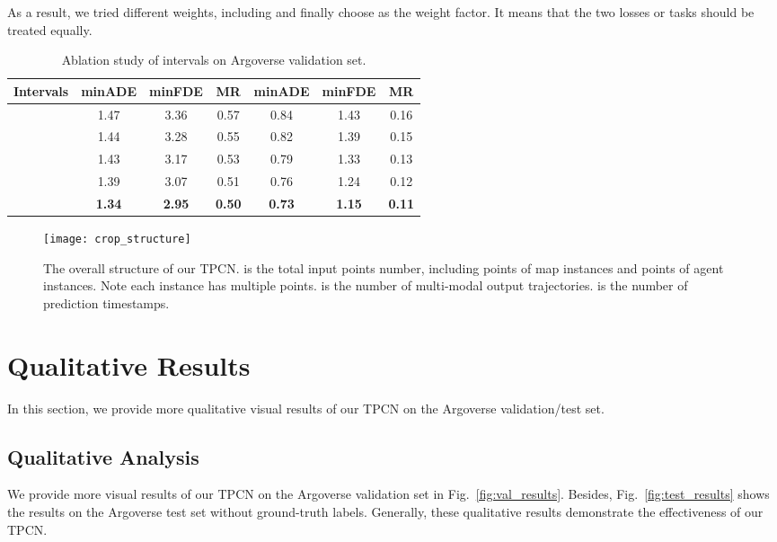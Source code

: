 \documentclass[final]{cvpr}
\begin{document}
As a result, we tried different weights, including  and finally choose  as the weight factor. It means that the two losses or tasks should be treated equally.
\begin{table*}[!t]
   \begin{center}
      \small
      \centering
\def\arraystretch{1.2}
      \begin{tabular}{c |c c c|c c c}
         \hline
         {Intervals}&
         { minADE} & { minFDE} & { MR} & { minADE} & { minFDE} & { MR} \\
         \hline
           & 1.47 & 3.36 & 0.57 & 0.84 & 1.43 & 0.16 \\
         \hline
          & 1.44 & 3.28 & 0.55 & 0.82 & 1.39 & 0.15 \\
         \hline
           & 1.43 & 3.17 & 0.53 & 0.79 & 1.33 & 0.13\\
         \hline
          & 1.39 & 3.07 & 0.51 & 0.76 & 1.24 & 0.12\\ 
         \hline
          & \bf 1.34& \bf 2.95& \bf 0.50 &\bf 0.73 & \bf 1.15 & \bf 0.11 \\
         \hline
      \end{tabular}
   \end{center}
   \caption{Ablation study of intervals on Argoverse validation set.}
   \label{ablation_study_result}
   \vspace{-5px}
\end{table*}

\begin{figure}
    \centering
    \texttt{[image: crop\_structure]}
    \caption{The overall structure of our TPCN.  is the total input points number, including points of  map instances and points of  agent instances. Note each instance has multiple points.  is the number of multi-modal output trajectories.  is the number of prediction timestamps.}
    \label{fig:network}
\end{figure}

\section{Qualitative Results}
\label{sec:analyzes}

In this section, we provide more qualitative visual results of our TPCN on the Argoverse validation/test set.

\subsection{Qualitative Analysis}
We provide more visual results of our TPCN on the Argoverse validation set in Fig.~\ref{fig:val_results}. 
Besides, Fig.~\ref{fig:test_results} shows the results on the Argoverse test set without ground-truth labels.
Generally, these qualitative results demonstrate the effectiveness of our TPCN.
\end{document}
